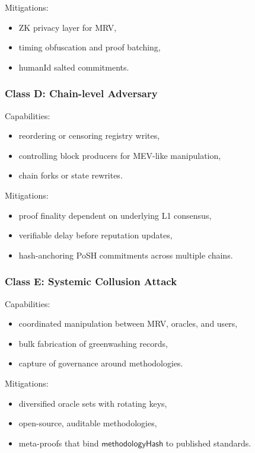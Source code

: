 \documentclass{article}
\begin{document}
Mitigations:

\begin{itemize}
\item ZK privacy layer for MRV,
\item timing obfuscation and proof batching,
\item humanId salted commitments.
\end{itemize}

\subsubsection{Class D: Chain-level Adversary}

Capabilities:

\begin{itemize}
\item reordering or censoring registry writes,
\item controlling block producers for MEV-like manipulation,
\item chain forks or state rewrites.
\end{itemize}

Mitigations:

\begin{itemize}
\item proof finality dependent on underlying L1 consensus,
\item verifiable delay before reputation updates,
\item hash-anchoring PoSH commitments across multiple chains.
\end{itemize}

\subsubsection{Class E: Systemic Collusion Attack}

Capabilities:

\begin{itemize}
\item coordinated manipulation between MRV, oracles, and users,
\item bulk fabrication of greenwashing records,
\item capture of governance around methodologies.
\end{itemize}

Mitigations:

\begin{itemize}
\item diversified oracle sets with rotating keys,
\item open-source, auditable methodologies,
\item meta-proofs that bind $\mathsf{methodologyHash}$ to published standards.
\end{itemize}
\end{document}
